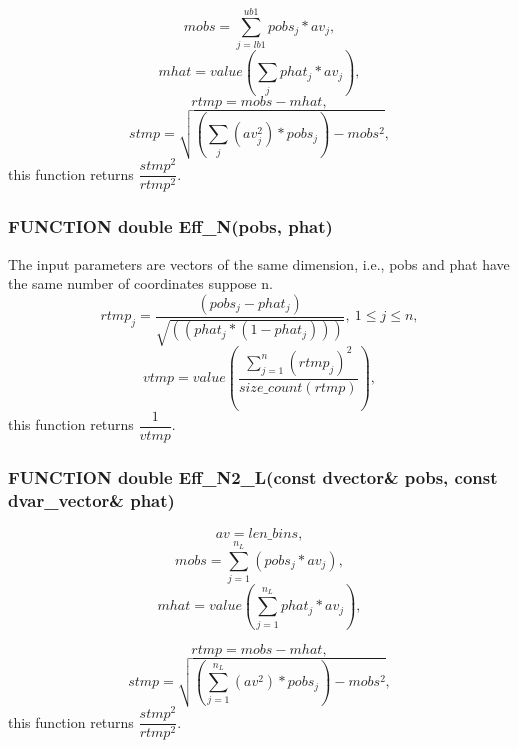 \documentclass{article}
\begin{document}
\begin{equation}
     mobs = \sum_{j=lb1}^{ub1}pobs_j*av_j,
\end{equation}
\begin{equation}
    mhat = value\left(\sum_{j}phat_j*av_j\right),
\end{equation}
\begin{equation}
    rtmp = mobs-mhat,
\end{equation}
\begin{equation}
    stmp = \sqrt{\left(\sum_{j}(av_j^2)*pobs_j\right) - mobs^2},
\end{equation}
this function returns $\dfrac{stmp^2}{rtmp^2}$.\\

\subsubsection{FUNCTION double Eff\_N(pobs, phat)}
The input parameters are vectors of the same dimension, i.e., pobs and phat have the same number of coordinates suppose n.
\begin{equation}
    rtmp_j = \dfrac{(pobs_j-phat_j)}{\sqrt{((phat_j*(1-phat_j)))}},\ 1\leq j \leq n,
\end{equation}
\begin{equation}
    vtmp = value\left(\dfrac{\sum_{j=1}^n(rtmp_j)^2}{size\_count(rtmp)}\right),
\end{equation}
this function returns $\dfrac{1}{vtmp}$.\\


\subsubsection{FUNCTION double Eff\_N2\_L(const dvector\& pobs, const dvar\_vector\& phat)}
\begin{equation}
    av = len\_bins, 
\end{equation}
\begin{equation}
    mobs =   \sum_{j=1}^{n_L}(pobs_j*av_j),
\end{equation}
\begin{equation}
    mhat = value\left(\sum_{j=1}^{n_L}phat_j*av_j\right),
\end{equation}

\begin{equation}
    rtmp = mobs-mhat,
\end{equation}
\begin{equation}
    stmp = \sqrt{\left(\sum_{j=1}^{n_L}(av^2)*pobs_j\right) - mobs^2},
\end{equation}
this function returns $\dfrac{stmp^2}{rtmp^2}$.\\
\end{document}

